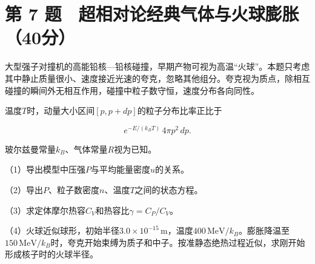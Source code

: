 \documentclass[12pt,a4paper,fontset=fandol]{ctexart}
\begin{document}
\clearpage

\section{第 7
题　超相对论经典气体与火球膨胀（40分）}\label{ux7b2c-7-ux9898-ux8d85ux76f8ux5bf9ux8bbaux7ecfux5178ux6c14ux4f53ux4e0eux706bux7403ux81a8ux80c040ux5206}

大型强子对撞机的高能铅核---铅核碰撞，早期产物可视为高温``火球''。本题只考虑其中静止质量很小、速度接近光速的夸克，忽略其他组分。夸克视为质点，除相互碰撞的瞬间外无相互作用，碰撞中粒子数守恒，速度分布各向同性。

温度\(T\)时，动量大小区间\([p,p+dp]\)的粒子分布比率正比于

\[
e^{-E/(k_BT)}\,4\pi p^2\,dp.
\]

玻尔兹曼常量\(k_B\)、气体常量\(R\)视为已知。

（1）导出模型中压强\(P\)与平均能量密度\(u\)的关系。

（2）导出\(P\)、粒子数密度\(n\)、温度\(T\)之间的状态方程。

（3）求定体摩尔热容\(C_V\)和热容比\(\gamma=C_P/C_V\)。

（4）火球近似球形，初始半径\(3.0\times10^{-15}\,\mathrm m\)，温度\(400\,\mathrm{MeV}/k_B\)。膨胀降温至\(150\,\mathrm{MeV}/k_B\)时，夸克开始束缚为质子和中子。按准静态绝热过程近似，求刚开始形成核子时的火球半径。
\end{document}
